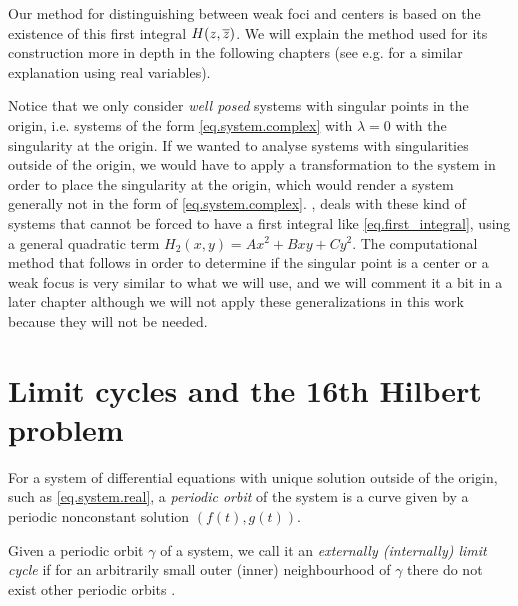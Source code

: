 Our method for distinguishing between weak foci and centers is based on the existence of this first integral $H(z,\overline{z})$. We will explain the method used for its construction more in depth in the following chapters (see e.g.  for a similar explanation using real variables).

\begin{observacio}
Notice that we only consider \emph{well posed} systems with singular points in the origin, i.e. systems of the form \eqref{eq.system.complex} with $\lambda=0$ with the singularity at the origin. If we wanted to analyse systems with singularities outside of the origin, we would have to apply a transformation to the system in order to place the singularity at the origin, which would render a system generally not in the form of \eqref{eq.system.complex}. \textcite{Christopher2006}, deals with these kind of systems that cannot be forced to have a first integral like \eqref{eq.first_integral}, using a general quadratic term $H_2(x,y)=Ax^2+Bxy+Cy^2$. The computational method that follows in order to determine if the singular point is a center or a weak focus is very similar to what we will use, and we will comment it a bit in a later chapter although we will not apply these generalizations in this work because they will not be needed.
\end{observacio}





\section{Limit cycles and the 16th Hilbert problem}

\begin{definicio}
For a system of differential equations with unique solution outside of the origin, such as \eqref{eq.system.real}, a \emph{periodic orbit} of the system is a curve given by a periodic nonconstant solution $(f(t),g(t))$.
\end{definicio}

\begin{definicio}
Given a periodic orbit $\gamma$ of a system, we call it an \emph{externally (internally) limit cycle} if for an arbitrarily small outer (inner) neighbourhood of $\gamma$ there do not exist other periodic orbits \parencite{Dumortier2006}.
\end{definicio}

